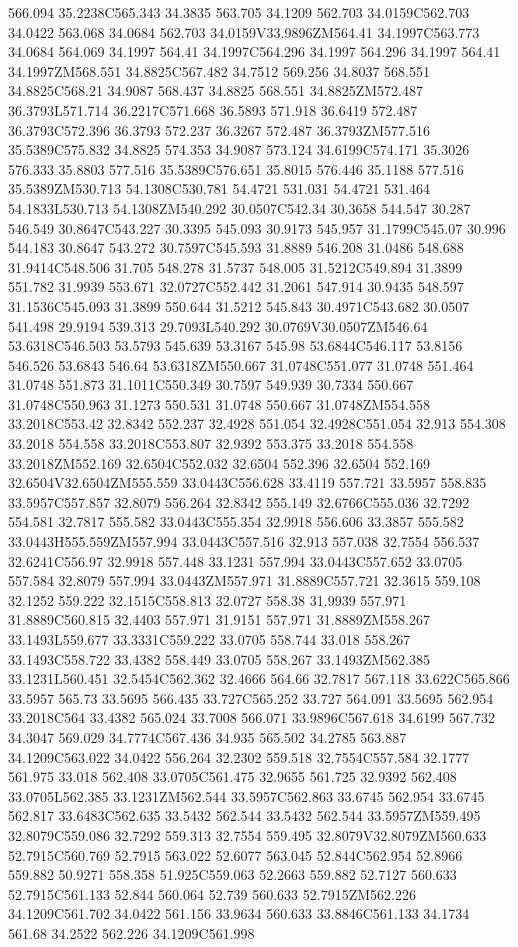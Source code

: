 566.094 35.2238C565.343 34.3835 563.705 34.1209 562.703 34.0159C562.703 34.0422 563.068 34.0684 562.703 34.0159V33.9896ZM564.41 34.1997C563.773 34.0684 564.069 34.1997 564.41 34.1997C564.296 34.1997 564.296 34.1997 564.41 34.1997ZM568.551 34.8825C567.482 34.7512 569.256 34.8037 568.551 34.8825C568.21 34.9087 568.437 34.8825 568.551 34.8825ZM572.487 36.3793L571.714 36.2217C571.668 36.5893 571.918 36.6419 572.487 36.3793C572.396 36.3793 572.237 36.3267 572.487 36.3793ZM577.516 35.5389C575.832 34.8825 574.353 34.9087 573.124 34.6199C574.171 35.3026 576.333 35.8803 577.516 35.5389C576.651 35.8015 576.446 35.1188 577.516 35.5389ZM530.713 54.1308C530.781 54.4721 531.031 54.4721 531.464 54.1833L530.713 54.1308ZM540.292 30.0507C542.34 30.3658 544.547 30.287 546.549 30.8647C543.227 30.3395 545.093 30.9173 545.957 31.1799C545.07 30.996 544.183 30.8647 543.272 30.7597C545.593 31.8889 546.208 31.0486 548.688 31.9414C548.506 31.705 548.278 31.5737 548.005 31.5212C549.894 31.3899 551.782 31.9939 553.671 32.0727C552.442 31.2061 547.914 30.9435 548.597 31.1536C545.093 31.3899 550.644 31.5212 545.843 30.4971C543.682 30.0507 541.498 29.9194 539.313 29.7093L540.292 30.0769V30.0507ZM546.64 53.6318C546.503 53.5793 545.639 53.3167 545.98 53.6844C546.117 53.8156 546.526 53.6843 546.64 53.6318ZM550.667 31.0748C551.077 31.0748 551.464 31.0748 551.873 31.1011C550.349 30.7597 549.939 30.7334 550.667 31.0748C550.963 31.1273 550.531 31.0748 550.667 31.0748ZM554.558 33.2018C553.42 32.8342 552.237 32.4928 551.054 32.4928C551.054 32.913 554.308 33.2018 554.558 33.2018C553.807 32.9392 553.375 33.2018 554.558 33.2018ZM552.169 32.6504C552.032 32.6504 552.396 32.6504 552.169 32.6504V32.6504ZM555.559 33.0443C556.628 33.4119 557.721 33.5957 558.835 33.5957C557.857 32.8079 556.264 32.8342 555.149 32.6766C555.036 32.7292 554.581 32.7817 555.582 33.0443C555.354 32.9918 556.606 33.3857 555.582 33.0443H555.559ZM557.994 33.0443C557.516 32.913 557.038 32.7554 556.537 32.6241C556.97 32.9918 557.448 33.1231 557.994 33.0443C557.652 33.0705 557.584 32.8079 557.994 33.0443ZM557.971 31.8889C557.721 32.3615 559.108 32.1252 559.222 32.1515C558.813 32.0727 558.38 31.9939 557.971 31.8889C560.815 32.4403 557.971 31.9151 557.971 31.8889ZM558.267 33.1493L559.677 33.3331C559.222 33.0705 558.744 33.018 558.267 33.1493C558.722 33.4382 558.449 33.0705 558.267 33.1493ZM562.385 33.1231L560.451 32.5454C562.362 32.4666 564.66 32.7817 567.118 33.622C565.866 33.5957 565.73 33.5695 566.435 33.727C565.252 33.727 564.091 33.5695 562.954 33.2018C564 33.4382 565.024 33.7008 566.071 33.9896C567.618 34.6199 567.732 34.3047 569.029 34.7774C567.436 34.935 565.502 34.2785 563.887 34.1209C563.022 34.0422 556.264 32.2302 559.518 32.7554C557.584 32.1777 561.975 33.018 562.408 33.0705C561.475 32.9655 561.725 32.9392 562.408 33.0705L562.385 33.1231ZM562.544 33.5957C562.863 33.6745 562.954 33.6745 562.817 33.6483C562.635 33.5432 562.544 33.5432 562.544 33.5957ZM559.495 32.8079C559.086 32.7292 559.313 32.7554 559.495 32.8079V32.8079ZM560.633 52.7915C560.769 52.7915 563.022 52.6077 563.045 52.844C562.954 52.8966 559.882 50.9271 558.358 51.925C559.063 52.2663 559.882 52.7127 560.633 52.7915C561.133 52.844 560.064 52.739 560.633 52.7915ZM562.226 34.1209C561.702 34.0422 561.156 33.9634 560.633 33.8846C561.133 34.1734 561.68 34.2522 562.226 34.1209C561.998 